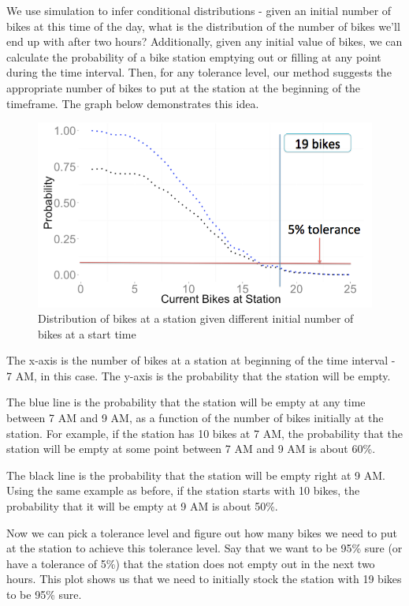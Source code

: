 \documentclass{acm_proc_article-sp}
\begin{document}
We use simulation to infer conditional distributions - given an initial number of bikes at this time of the day, what is the distribution of the number of bikes we'll end up with after two hours? Additionally, given any initial value of bikes, we can calculate the probability of a bike station emptying out or filling at any point during the time interval. Then, for any tolerance level, our method suggests the appropriate number of bikes to put at the station at the beginning of the timeframe. The graph below demonstrates this idea.

\begin{figure} [!h]
\caption{Distribution of bikes at a station given different initial number of bikes at a start time}
\centering
\includegraphics[scale = 0.3]{pr_of_empty_station.png}
\end{figure}

The x-axis is the number of bikes at a station at beginning of the time interval - 7 AM, in this case. The y-axis is the probability that the station will be empty.

The blue line is the probability that the station will be empty at any time between 7 AM and 9 AM, as a function of the number of bikes initially at the station. For example, if the station has 10 bikes at 7 AM, the probability that the station will be empty at some point between 7 AM and 9 AM is about 60\%.

The black line is the probability that the station will be empty right at 9 AM. Using the same example as before, if the station starts with 10 bikes, the probability that it will be empty at 9 AM is about 50\%.

Now we can pick a tolerance level and figure out how many bikes we need to put at the station to achieve this tolerance level. Say that we want to be 95\% sure (or have a tolerance of 5\%) that the station does not empty out in the next two hours. This plot shows us that we need to initially stock the station with 19 bikes to be 95\% sure.
\end{document}

